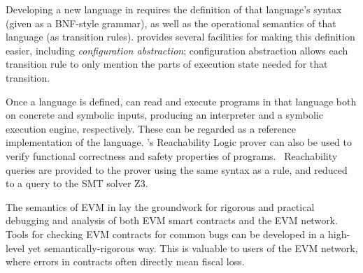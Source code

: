 Developing a new language in \K{} requires the definition of that language's
syntax (given as a BNF-style grammar), as well as the operational semantics of
that language (as transition rules). \K{} provides several facilities for making
this definition easier, including \textit{configuration abstraction};
configuration abstraction allows each transition rule to only mention the parts
of execution state needed for that transition.

Once a language is defined, \K{} can read and execute programs in that language
both on concrete and symbolic inputs, producing an interpreter and a symbolic
execution engine, respectively. These can be regarded as a reference
implementation of the language. \K{}'s Reachability Logic prover can also be used
to verify functional correctness and safety properties of
programs.~\cite{stefanescu-ciobaca-mereuta-moore-serbanuta-rosu-2014-rta}
Reachability queries are provided to the prover using the same syntax as a \K{}
rule, and reduced to a query to the SMT solver Z3.~\cite{de2008z3}


The semantics of EVM in \K{} lay the groundwork for rigorous and practical
debugging and analysis of both EVM smart contracts and the EVM network. Tools
for checking EVM contracts for common bugs can be developed in a high-level yet
semantically-rigorous way. This is valuable to users of the EVM network, where
errors in contracts often directly mean fiscal loss.
